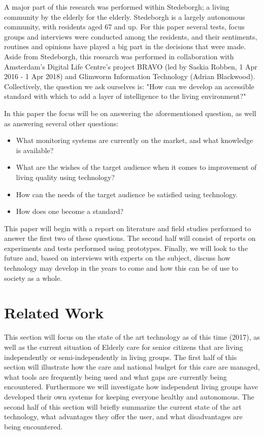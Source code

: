 \documentclass{below-ext}
\begin{document}
A major part of this research was performed within Stedeborgh; a living community by the elderly for the elderly. Stedeborgh is a largely autonomous community, with residents aged 67 and up. For this paper several tests, focus groups and interviews were conducted among the residents, and their sentiments, routines and opinions have played a big part in the decisions that were made. Aside from Stedeborgh, this research was performed in collaboration with Amsterdam's Digital Life Centre's project BRAVO (led by Saskia Robben, 1 Apr 2016 - 1 Apr 2018) and Glimworm Information Technology (Adrian Blackwood). Collectively, the question we ask ourselves is: "How can we develop an accessible standard with which to add a layer of intelligence to the living environment?" 

In this paper the focus will be on answering the aforementioned question, as well as answering several other questions:
\begin{itemize}
\item What monitoring systems are currently on the market, and what knowledge is available?
\item  What are the wishes of the target audience when it comes to improvement of living quality using technology?
\item How can the needs of the target audience be satisfied using technology.
\item How does one become a standard?
\end{itemize}

This paper will begin with a report on literature and field studies performed to answer the first two of these questions. The second half will consist of reports on experiments and tests performed using prototypes. Finally, we will look to the future and, based on interviews with experts on the subject, discuss how technology may develop in the years to come and how this can be of use to society as a whole.

\section{Related Work}
\justifying
This section will focus on the state of the art technology as of this time (2017), as well as the current situation of Elderly care for senior citizens that are living independently or semi-independently in living groups. The first half of this section will illustrate how the care and national budget for this care are managed, what tools are frequently being used and what gaps are currently being encountered. Furthermore we will investigate how independent living groups have developed their own systems for keeping everyone healthy and autonomous. The second half of this section will briefly summarize the current state of the art technology, what advantages they offer the user, and what disadvantages are being encountered.
\end{document}
